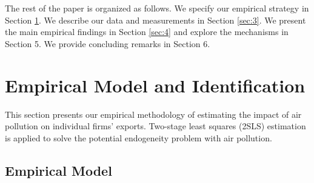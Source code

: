 \documentclass[12pt]{article}
\begin{document}
The rest of the paper is organized as follows. We specify our empirical
strategy in Section \ref{sec:empirical_strategy}. We describe our data and measurements in Section \ref{sec:3}.
We present the main empirical findings in Section \ref{sec:4} and explore the
mechanisms in Section 5. We provide concluding remarks in Section 6.

\section{Empirical Model and Identification}

\label{sec:empirical_strategy} This section presents our empirical
methodology of estimating the impact of air pollution on individual firms'
exports. Two-stage
least squares (2SLS)
estimation is applied to solve the potential endogeneity problem with
air pollution.

\subsection{Empirical Model}
\end{document}

